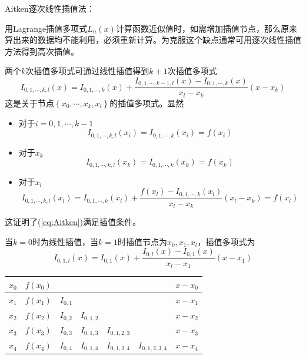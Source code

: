 \begin{note}
    Aitken逐次线性插值法：

    用Lagrange插值多项式$L_{n}(x)$计算函数近似值时，如需增加插值节点，那么原来算出来的数据均不能利用，必须重新计算。为克服这个缺点通常可用逐次线性插值方法得到高次插值。

    两个$k$次插值多项式可通过线性插值得到$k+1$次插值多项式
    \begin{equation}\label{eq:Aitken}
        I_{0,1,\cdots,k,l}(x) = I_{0,1,\cdots,k}(x)+\dfrac{I_{0,1,\cdots,k-1,l}(x)-I_{0,1,\cdots,k}(x)}{x_l-x_k}\left( x-x_k \right)
    \end{equation}
    这是关于节点$\left\{ x_0,\cdots,x_{k},x_{l} \right\}$的插值多项式。显然
    \begin{itemize}
        \item 对于$i = 0,1,\cdots,k-1$
        \[
            I_{0,1,\cdots,k,l}(x_i) = I_{0,1,\cdots,k}(x_i) = f(x_i)
        \]
        \item 对于$x_k$
        \[
            I_{0,1,\cdots,k,l}(x_k) = I_{0,1,\cdots,k}(x_k) = f(x_k)
        \]
        \item 对于$x_l$
        \[
            I_{0,1,\cdots,k,l}(x_l) = I_{0,1,\cdots,k}(x_l)+\dfrac{f(x_l)-I_{0,1,\cdots,k}(x_l)}{x_l-x_k}(x_l-x_k) = f(x_l)
        \]
    \end{itemize}
    这证明了(\ref{eq:Aitken})满足插值条件。

    当$k = 0$时为线性插值，当$k = 1$时插值节点为$x_0,x_1,x_l$，插值多项式为
    \[
        I_{0,1,l}(x) = I_{0,1}(x)+\dfrac{I_{0,l}(x)-I_{0,1}(x)}{x_l-x_1}(x-x_1)
    \]
    \begin{table}[htbp]
        \centering
        \begin{tabular}{|c|c|c|c|c|c|c|}
            \hline
            $x_0$ & $f(x_0)$ &     &     &     &     & $x-x_0$ \bigstrut\\
            \hline
            $x_1$ & $f(x_1)$ & $I_{0,1}$ &     &     &     & $x-x_1$ \bigstrut\\
            \hline
            $x_2$ & $f(x_2)$ & $I_{0,2}$ & $I_{0,1,2}$ &     &     & $x-x_2$ \bigstrut\\
            \hline
            $x_3$ & $f(x_3)$ & $I_{0,3}$ & $I_{0,1,3}$ & $I_{0,1,2,3}$ &     & $x-x_3$ \bigstrut\\
            \hline
            $x_4$ & $f(x_4)$ & $I_{0,4}$ & $I_{0,1,4}$ & $I_{0,1,2,4}$ & $I_{0,1,2,3,4}$ & $x-x_4$ \bigstrut\\
            \hline
        \end{tabular}%
  \end{table}%
\end{note}
